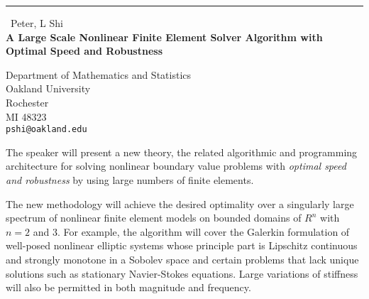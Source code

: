 \documentclass{report}
\begin{document}
\begin{center}
\rule{6in}{1pt} \
{\large Peter, L Shi \\
{\bf A Large Scale Nonlinear Finite Element Solver Algorithm with Optimal Speed and Robustness}}

Department of Mathematics and Statistics \\ Oakland University \\ Rochester \\ MI 48323
\\
{\tt pshi@oakland.edu}\end{center}

The speaker will present a new theory, the related algorithmic and
programming architecture for solving nonlinear boundary value problems
with {\it optimal speed and robustness} by using large numbers of finite
elements.


The new methodology will achieve the desired optimality
over a singularly large spectrum of nonlinear finite element models on
bounded domains of $R^n$ with $n=2$ and 3.
For example, the algorithm will cover the Galerkin formulation
of well-posed nonlinear elliptic systems whose principle part is
Lipschitz continuous and strongly monotone in a Sobolev space and certain
problems that lack unique solutions such as stationary Navier-Stokes
equations. Large variations of stiffness will also be permitted in both
magnitude and frequency.
\end{document}
